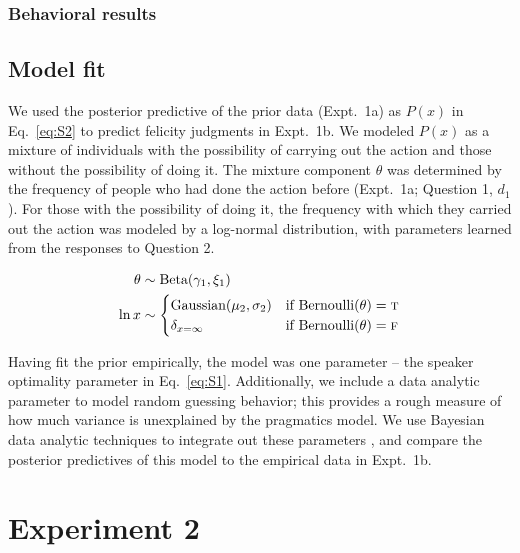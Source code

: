 \documentclass[10pt,letterpaper]{article}
\begin{document}
\subsubsection{Behavioral results}

\subsection{Model fit}

We used the posterior predictive of the prior data (Expt.~1a) as  $P(x)$  in Eq.~\ref{eq:S2} to predict felicity judgments in Expt.~1b.
We modeled $P(x)$ as a mixture of individuals with the possibility of carrying out the action and those without the possibility of doing it. 
The mixture component $\theta$ was determined by the frequency of people who had done the action before (Expt.~1a; Question 1, $d_1$). 
For those with the possibility of doing it, the frequency with which they carried out the action was modeled by a log-normal distribution, with parameters learned from the responses to Question 2. 

\begin{minipage}{0.5 \textwidth} \small
\begin{align*}
\theta & \sim \text{Beta}(\gamma_{1}, \xi_{1}) \\ 
\ln x & \sim \begin{cases} 
		\text{Gaussian}(\mu_{2}, \sigma_{2}) &\mbox{if } \text{Bernoulli}(\theta) = \textsc{t} \\
				\delta_{x=\infty} &\mbox{if } \text{Bernoulli}(\theta) = \textsc{f} \\
		\end{cases} \\
\end{align*}
\end{minipage}

Having fit the prior empirically, the model was one parameter -- the speaker optimality parameter in Eq.~\ref{eq:S1}. 
Additionally, we include a data analytic parameter to model random guessing behavior; this provides a rough measure of how much variance is unexplained by the pragmatics model. 
We use Bayesian data analytic techniques to integrate out these parameters \cite{LW2014}, and compare the posterior predictives of this model to the empirical data in Expt.~1b.

\section{Experiment 2}
\end{document}
